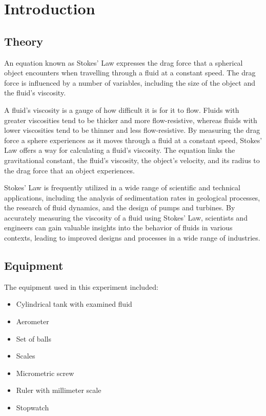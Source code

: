 \section{Introduction}

\subsection{Theory}
An equation known as Stokes' Law expresses the drag force that a spherical object encounters when travelling through a fluid at a constant speed. The drag force is influenced by a number of variables, including the size of the object and the fluid's viscosity.

A fluid's viscosity is a gauge of how difficult it is for it to flow. Fluids with greater viscosities tend to be thicker and more flow-resistive, whereas fluids with lower viscosities tend to be thinner and less flow-resistive.
By measuring the drag force a sphere experiences as it moves through a fluid at a constant speed, Stokes' Law offers a way for calculating a fluid's viscosity. The equation links the gravitational constant, the fluid's viscosity, the object's velocity, and its radius to the drag force that an object experiences.

Stokes' Law is frequently utilized in a wide range of scientific and technical applications, including the analysis of sedimentation rates in geological processes, the research of fluid dynamics, and the design of pumps and turbines. By accurately measuring the viscosity of a fluid using Stokes' Law, scientists and engineers can gain valuable insights into the behavior of fluids in various contexts, leading to improved designs and processes in a wide range of industries.



\subsection{Equipment}
The equipment used in this experiment included:
\begin{itemize}
	\item Cylindrical tank with examined fluid
\item Aerometer
\item Set of balls
\item  Scales
\item Micrometric screw
\item Ruler with millimeter scale
\item Stopwatch

\end{itemize}


